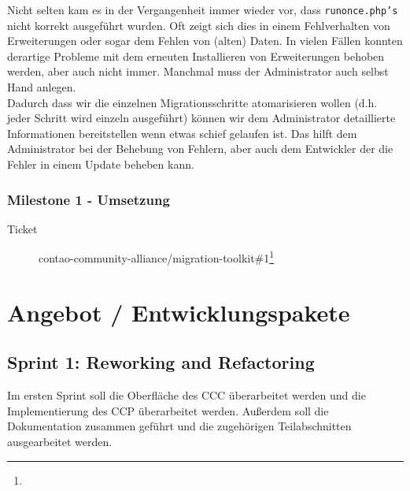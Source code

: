 \documentclass[
paper=a4,
draft=false,%
fontsize=10pt%
]{scrartcl}
\begin{document}
Nicht selten kam es in der Vergangenheit immer wieder vor, dass \texttt{runonce.php's} nicht korrekt ausgeführt wurden. Oft zeigt sich dies in einem Fehlverhalten von Erweiterungen oder sogar dem Fehlen von (alten) Daten. In vielen Fällen konnten derartige Probleme mit dem erneuten Installieren von Erweiterungen behoben werden, aber auch nicht immer. Manchmal muss der Administrator auch selbst Hand anlegen.\\
Dadurch dass wir die einzelnen Migrationsschritte atomarisieren wollen (d.h. jeder Schritt wird einzeln ausgeführt) können wir dem Administrator detaillierte Informationen bereitstellen wenn etwas schief gelaufen ist. Das hilft dem Administrator bei der Behebung von Fehlern, aber auch dem Entwickler der die Fehler in einem Update beheben kann.

\subsubsection{Milestone 1 - Umsetzung}
\label{subsec:mtk-milestone-1}

\begin{description}
\item[Ticket] contao-community-alliance/migration-toolkit\#1\footnote{}
\end{description}

\newpage

%
%

\section{Angebot / Entwicklungspakete}
\label{sec:offer}

\subsection{Sprint 1: Reworking and Refactoring}
\label{subsec:sprint-1}

Im ersten Sprint soll die Oberfläche des CCC überarbeitet werden und die Implementierung des CCP überarbeitet werden.
Außerdem soll die Dokumentation zusammen geführt und die zugehörigen Teilabschnitten ausgearbeitet werden.
\end{document}

